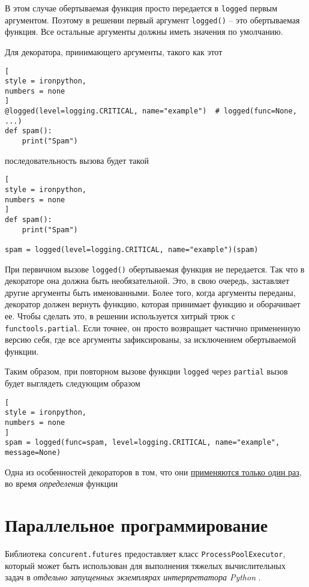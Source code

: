 \documentclass[%
	11pt,
	a4paper,
	utf8,
		]{article}
\begin{document}
В этом случае обертываемая функция просто передается в \texttt{logged} первым аргументом. Поэтому в решении первый аргумент \texttt{logged()} -- это обертываемая функция. Все остальные аргументы должны иметь значения по умолчанию.

Для декоратора, принимающего аргументы, такого как этот
\begin{lstlisting}[
style = ironpython,
numbers = none
]
@logged(level=logging.CRITICAL, name="example")  # logged(func=None, ...)
def spam():
    print("Spam")
\end{lstlisting}
последовательность вызова будет такой
\begin{lstlisting}[
style = ironpython,
numbers = none
]
def spam():
    print("Spam")

spam = logged(level=logging.CRITICAL, name="example")(spam)
\end{lstlisting}

При первичном вызове \verb|logged()| обертываемая функция не передается. Так что в декораторе она должна быть необязательной. Это, в свою очередь, заставляет другие аргументы быть именованными. Более того, когда аргументы переданы, декоратор должен вернуть функцию, которая принимает функцию и оборачивает ее. Чтобы сделать это, в решении используется хитрый трюк с \texttt{functools.partial}. Если точнее, он просто возвращает частично примененную версию себя, где все аргументы зафиксированы, за исключением обертываемой функции.

Таким образом, при повторном вызове функции \texttt{logged} через \texttt{partial} вызов будет выглядеть следующим образом
\begin{lstlisting}[
style = ironpython,
numbers = none
]
spam = logged(func=spam, level=logging.CRITICAL, name="example", message=None)
\end{lstlisting}

Одна из особенностей декораторов в том, что они \underline{применяются только один раз}, во время \emph{определения} функции \cite[]{beazley:python_cookbook-2019}

\section{Параллельное программирование}

Библиотека \texttt{concurent.futures} предоставляет класс \texttt{ProcessPoolExecutor}, который может быть использован для выполнения тяжелых вычислительных задач в \emph{отдельно запущенных экземплярах интерпретатора Python} \cite[]{beazley:python_cookbook-2019}.
\end{document}
